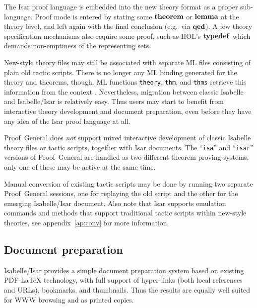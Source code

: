 The Isar proof language is embedded into the new theory format as a proper
sub-language.  Proof mode is entered by stating some ${\mathord{\mathbf{theorem}}}$ or
${\mathord{\mathbf{lemma}}}$ at the theory level, and left again with the final conclusion
(e.g.\ via ${\mathord{\mathbf{qed}}}$).  A few theory specification mechanisms also require
some proof, such as HOL's ${\mathord{\mathbf{typedef}}}$ which demands non-emptiness
of the representing sets.

New-style theory files may still be associated with separate ML files
consisting of plain old tactic scripts.  There is no longer any ML binding
generated for the theory and theorems, though.  ML functions \texttt{theory},
\texttt{thm}, and \texttt{thms} retrieve this information from the context
\cite{isabelle-ref}.  Nevertheless, migration between classic Isabelle and
Isabelle/Isar is relatively easy.  Thus users may start to benefit from
interactive theory development and document preparation, even before they have
any idea of the Isar proof language at all.

\begin{warn}
  Proof~General does \emph{not} support mixed interactive development of
  classic Isabelle theory files or tactic scripts, together with Isar
  documents.  The ``\texttt{isa}'' and ``\texttt{isar}'' versions of
  Proof~General are handled as two different theorem proving systems, only one
  of these may be active at the same time.
\end{warn}

Manual conversion of existing tactic scripts may be done by running two
separate Proof~General sessions, one for replaying the old script and the
other for the emerging Isabelle/Isar document.  Also note that Isar supports
emulation commands and methods that support traditional tactic scripts within
new-style theories, see appendix~\ref{ap:conv} for more information.


\subsection{Document preparation}\label{sec:document-prep}

Isabelle/Isar provides a simple document preparation system based on existing
{PDF-\LaTeX} technology, with full support of hyper-links (both local
references and URLs), bookmarks, and thumbnails.  Thus the results are equally
well suited for WWW browsing and as printed copies.

\medskip

